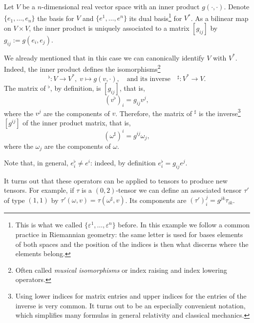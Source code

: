 \begin{example}\label{ex:musicaliso}
  Let $V$ be a $n$-dimensional real vector space with an inner product $g(\cdot, \cdot)$.
  Denote $\{e_1, \ldots, e_n\}$ the basis for $V$ and $\{e^1, \ldots, e^n\}$ its dual basis\footnote{This is what we called $\{\varepsilon^1, \ldots,\varepsilon^n\}$ before. In this example we follow a common practice in Riemannian geometry: the same letter is used for bases elements of both spaces and the position of the indices is then what discerns where the elements belong.} for $V^*$.
  As a bilinear map on $V\times V$, the inner product is uniquely associated to a matrix $[g_{ij}]$ by $g_{ij} := g(e_i, e_j)$.

  We already mentioned that in this case we can canonically identify $V$ with $V^*$.
  Indeed, the inner product defines the isomorphisms\footnote{Often called \emph{musical isomorphisms} or index raising and index lowering operators.}
  \begin{equation}
    {}^\flat: V \to V^*,\; v\mapsto g(v, \cdot),
    \quad\mbox{and its inverse}\quad
    {}^\sharp: V^*\to V.
  \end{equation}
  The matrix of ${}^\flat$, by definition, is $[g_{ij}]$, that is,
  \begin{equation}
    (v^\flat)_i = g_{ij} v^j,
  \end{equation}
  where the $v^j$ are the components of $v$.
  Therefore, the matrix of ${}^\sharp$ is the inverse\footnote{Using lower indices for matrix entries and upper indices for the entries of the inverse is very common. It turns out to be an especially convenient notation, which simplifies many formulas in general relativity and classical mechanics.} $[g^{ij}]$ of the inner product matrix, that is,
  \begin{equation}
    (\omega^\sharp)^i = g^{ij}\omega_j,
  \end{equation}
  where the $\omega_j$ are the components of $\omega$.

  Note that, in general, $e^\flat_i\neq e^i$: indeed, by definition $e^\flat_i = g_{ij}e^j$.

  It turns out that these operators can be applied to tensors to produce new tensors.
  For example, if $\tau$ is a $(0,2)$-tensor we can define an associated tensor $\tau'$ of type $(1,1)$ by $\tau'(\omega, v) = \tau(\omega^\sharp, v)$.
  Its components are $(\tau')_i^j = g^{jk}\tau_{ik}$.
\end{example}

